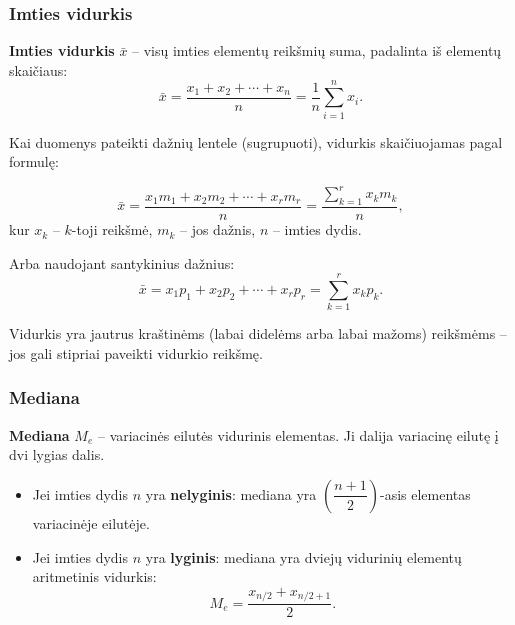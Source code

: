 \subsubsection*{Imties vidurkis}

\begin{definition}
\textbf{Imties vidurkis} $\bar{x}$ – visų imties elementų reikšmių suma, padalinta
iš elementų skaičiaus:
\[
  \bar{x} = \frac{x_1 + x_2 + \cdots + x_n}{n} = \frac{1}{n}\sum_{i=1}^{n} x_i.
\]
\end{definition}

Kai duomenys pateikti dažnių lentele (sugrupuoti), vidurkis skaičiuojamas pagal formulę:

\begin{tcolorbox}[colback=blue!5!white, colframe=blue!60!black, title=Sugrupuotos imties vidurkis]
\[
  \bar{x} = \frac{x_1 m_1 + x_2 m_2 + \cdots + x_r m_r}{n}
            = \frac{\displaystyle\sum_{k=1}^{r} x_k m_k}{n},
\]
kur $x_k$ – $k$-toji reikšmė, $m_k$ – jos dažnis, $n$ – imties dydis.
\end{tcolorbox}

Arba naudojant santykinius dažnius:
\[
  \bar{x} = x_1 p_1 + x_2 p_2 + \cdots + x_r p_r = \sum_{k=1}^{r} x_k p_k.
\]

\begin{remark}
Vidurkis yra jautrus kraštinėms (labai didelėms arba labai mažoms) reikšmėms –
jos gali stipriai paveikti vidurkio reikšmę.
\end{remark}

\subsubsection*{Mediana}

\begin{definition}[Mediana]
\textbf{Mediana} $M_e$ – variacinės eilutės vidurinis elementas. Ji dalija
variacinę eilutę į dvi lygias dalis.
\begin{itemize}
  \item Jei imties dydis $n$ yra \textbf{nelyginis}: mediana yra
        $\left(\dfrac{n+1}{2}\right)$-asis elementas variacinėje eilutėje.
  \item Jei imties dydis $n$ yra \textbf{lyginis}: mediana yra dviejų vidurinių
        elementų aritmetinis vidurkis:
        \[
          M_e = \frac{x_{n/2} + x_{n/2+1}}{2}.
        \]
\end{itemize}
\end{definition}

